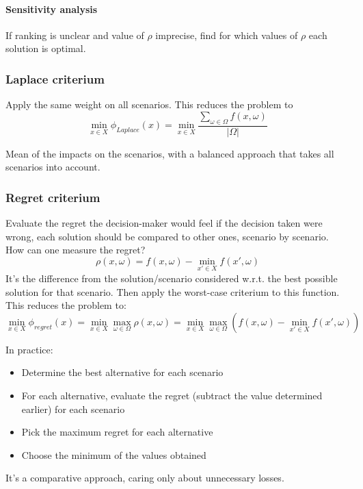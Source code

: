 \paragraph{Sensitivity analysis} If ranking is unclear and value of $\rho$ imprecise, find for which values of $\rho$ each solution is optimal.

\subsubsection{Laplace criterium}

Apply the same weight on all scenarios. This reduces the problem to
$$ \min_{x \in X} \phi_{Laplace} (x) = \min_{x \in X} \frac{\sum_{\omega \in \Omega} f (x, \omega)}{|\Omega|} $$

Mean of the impacts on the scenarios, with a balanced approach that takes all scenarios into account.

\subsubsection{Regret criterium}

Evaluate the regret the decision-maker would feel if the decision taken were wrong, each solution should be compared to other ones, scenario by scenario. How can one measure the regret? 
$$ \rho (x, \omega) = f(x, \omega) - \min_{x' \in X} f (x', \omega) $$
It's the difference from the solution/scenario considered w.r.t. the best possible solution for that scenario. Then apply the worst-case criterium to this function. This reduces the problem to: 
$$ \min_{x \in X} \phi_{regret} (x) = \min_{x \in X} \max_{\omega \in \Omega} \rho (x, \omega) = \min_{x \in X} \max_{\omega \in \Omega} \left(f(x, \omega) - \min_{x' \in X} f(x', \omega) \right) $$

In practice: 
\begin{itemize}
	\item Determine the best alternative for each scenario
	
	\item For each alternative, evaluate the regret (subtract the value determined earlier) for each scenario
	
	\item Pick the maximum regret for each alternative
	
	\item Choose the minimum of the values obtained
\end{itemize}

It's a comparative approach, caring only about unnecessary losses.

